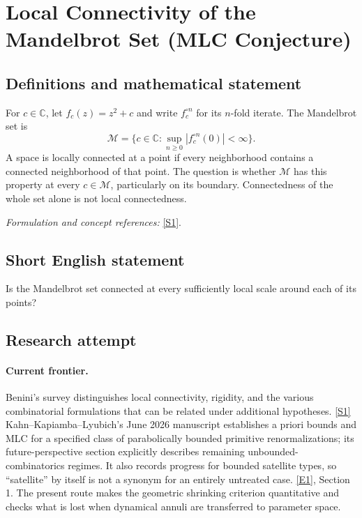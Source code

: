 \documentclass[11pt,a4paper]{article}
\newcommand{\C}{\mathbb{C}}
\newcommand{\sref}[2]{\hyperlink{source:#1:#2}{[S#2]}}
\newcommand{\eref}[2]{\hyperlink{extra:#1:#2}{[E#2]}}
\newif\ifshowcatalogue
\newcommand{\cataloguescope}[1]{\ifshowcatalogue
 \paragraph{Exact scope in the supplied catalogue.}
 \begin{quote}\small #1\end{quote}\fi}
\numberwithin{equation}{section}
\begin{document}
\setcounter{section}{126}
\clearpage
\section{\texorpdfstring{Local Connectivity of the Mandelbrot Set (MLC Conjecture)}{Local Connectivity of the Mandelbrot Set (MLC Conjecture)}}\label{127}
\subsection{Definitions and mathematical statement}
For $c\in\C$, let $f_c(z)=z^2+c$ and write $f_c^{\circ n}$ for its $n$-fold iterate. The Mandelbrot set is
\[
 \mathcal M=\{c\in\C:\sup_{n\ge0}|f_c^{\circ n}(0)|<\infty\}.
\]
A space is locally connected at a point if every neighborhood contains a connected neighborhood of that point. The question is whether $\mathcal M$ has this property at every $c\in\mathcal M$, particularly on its boundary. Connectedness of the whole set alone is not local connectedness.
\par\smallskip\textit{Formulation and concept references:} \sref{127}{1}.
\cataloguescope{Determine whether the Mandelbrot set M = \{c in C : the orbit of 0 under z -> z\textasciicircum{}2 + c is bounded\} is locally connected at every point.}
\subsection{Short English statement}
Is the Mandelbrot set connected at every sufficiently local scale around each of its points?
\subsection{Research attempt}

\paragraph{Current frontier.}
Benini's survey distinguishes local connectivity, rigidity, and the
various combinatorial formulations that can be related under additional
hypotheses. \sref{127}{1}
Kahn--Kapiamba--Lyubich's June 2026 manuscript establishes a priori
bounds and MLC for a specified class of parabolically bounded primitive
renormalizations; its future-perspective section explicitly describes
remaining unbounded-combinatorics regimes.  It also records progress for
bounded satellite types, so ``satellite'' by itself is not a synonym
for an entirely untreated case. \eref{127}{1}, Section 1.
The present route makes the geometric shrinking criterion quantitative
and checks what is lost when dynamical annuli are transferred to
parameter space.
\end{document}
